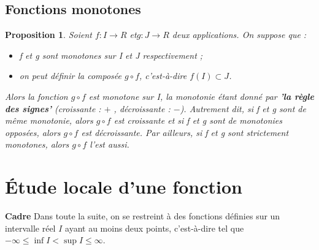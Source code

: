 \documentclass[12pt]{book}
\theoremstyle{definition}\newtheorem{dfn}{Définition}[chapter]
\theoremstyle{plain}\newtheorem{thm}{Théorème}[chapter]
\theoremstyle{plain}\newtheorem{prp}{Proposition}[chapter]
\theoremstyle{plain}\newtheorem{lem}{\bf Lemme}[chapter]
\theoremstyle{plain}\newtheorem{axm}{\bf Axiome}[chapter]
\theoremstyle{plain}\newtheorem{lmm}{\bf Lemme}[chapter]
\theoremstyle{plain}\newtheorem{exm}{\bf Example}[chapter]
\theoremstyle{plain}\newtheorem{cor}{\bf Corollaire}[chapter]
\theoremstyle{remark}\newtheorem{rem}{Remarque}[chapter]
\begin{document}
\section{Fonctions monotones}

\begin{prp}
Soient $f : I\rightarrow R$ et$ g : J \rightarrow R$ deux applications. On suppose que :
\begin{itemize}
\item f et g sont monotones sur I et J respectivement ;

\item on peut définir la composée $g\circ f$, c'est-à-dire $f(I) \subset J$.
\end{itemize}

Alors la fonction $g\circ f$ est monotone sur I, la monotonie étant donné par \textbf{'la règle des signes'} (croissante : $+$ ,
décroissante : $-$). Autrement dit, si f et g sont de même monotonie, alors $g\circ f$ est croissante et si f et g sont de monotonies opposées, alors  $g\circ f$ est décroissante.
Par ailleurs, si f et g sont strictement monotones, alors  $g\circ f$ l'est aussi.

\end{prp}

\chapter{Étude locale d'une fonction}
\textbf{Cadre} Dans toute la suite, on se restreint à des fonctions définies sur un intervalle réel $I$ ayant au moins deux points, c'est-à-dire tel que $-\infty\le \inf I < \sup I\le \infty$.
\end{document}
